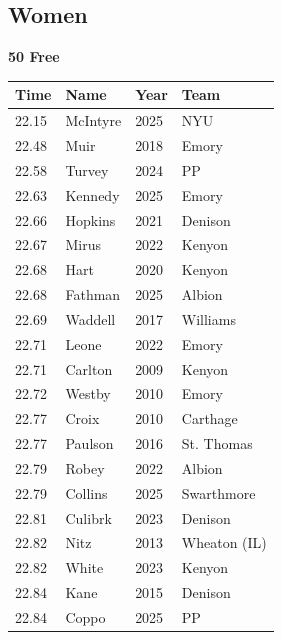 \subsection{Women}
\vspace{1.2em}
\noindent\begin{minipage}[t]{0.98\textwidth}
\centering
\textbf{\textcolor{teamprimary}{50 Free}}\par
\vspace{0.5em}
\centering
\small
\renewcommand{\arraystretch}{1.0}
\setlength{\tabcolsep}{4pt}
\begin{tabular}{@{}p{2.5cm}p{4.5cm}p{1.5cm}p{2.5cm}@{}}
\toprule
\textbf{Time} & \textbf{Name} & \textbf{Year} & \textbf{Team} \\
\midrule
22.15 & McIntyre & 2025 & NYU \\
22.48 & Muir & 2018 & Emory \\
22.58 & Turvey & 2024 & PP \\
22.63 & Kennedy & 2025 & Emory \\
22.66 & Hopkins & 2021 & Denison \\
22.67 & Mirus & 2022 & Kenyon \\
22.68 & Hart & 2020 & Kenyon \\
22.68 & Fathman & 2025 & Albion \\
22.69 & Waddell & 2017 & Williams \\
22.71 & Leone & 2022 & Emory \\
22.71 & Carlton & 2009 & Kenyon \\
22.72 & Westby & 2010 & Emory \\
22.77 & Croix & 2010 & Carthage \\
22.77 & Paulson & 2016 & St. Thomas \\
22.79 & Robey & 2022 & Albion \\
22.79 & Collins & 2025 & Swarthmore \\
22.81 & Culibrk & 2023 & Denison \\
22.82 & Nitz & 2013 & Wheaton (IL) \\
22.82 & White & 2023 & Kenyon \\
22.84 & Kane & 2015 & Denison \\
22.84 & Coppo & 2025 & PP \\
\bottomrule
\end{tabular}
\end{minipage}
\vspace{1.2em}
